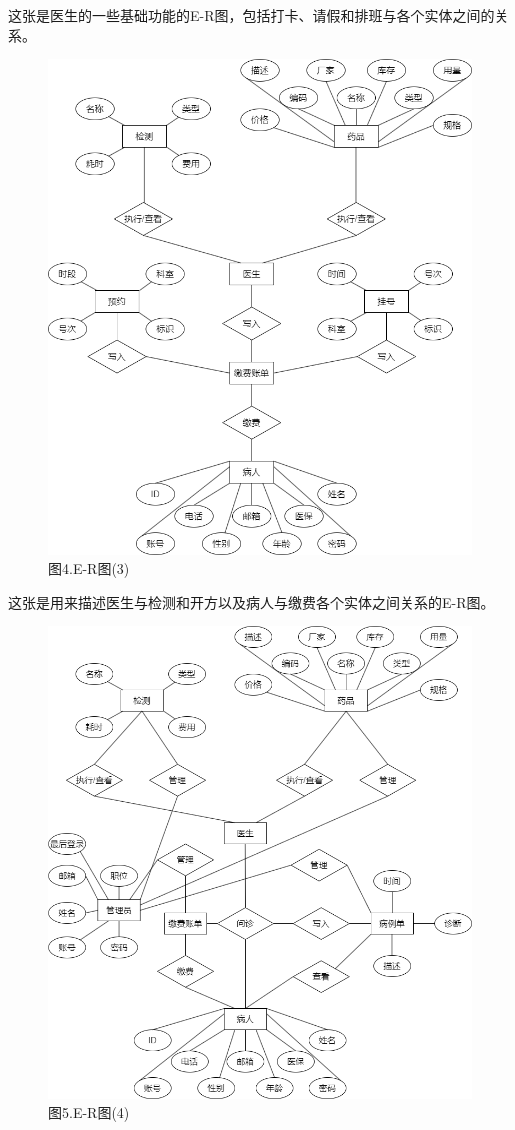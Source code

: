\documentclass[24pt,a4paper]{article}%
\begin{document}
这张是医生的一些基础功能的E-R图，包括打卡、请假和排班与各个实体之间的关系。
\begin{figure}[H]
    \centering
    \includegraphics[width=1\textwidth]{image/ERGraph3.png}
    \caption*{图4.E-R图(3)}
\end{figure}
这张是用来描述医生与检测和开方以及病人与缴费各个实体之间关系的E-R图。
\begin{figure}[H]
    \centering
    \includegraphics[width=1\textwidth]{image/ERGraph4.png}
    \caption*{图5.E-R图(4)}
\end{figure}
\end{document}
